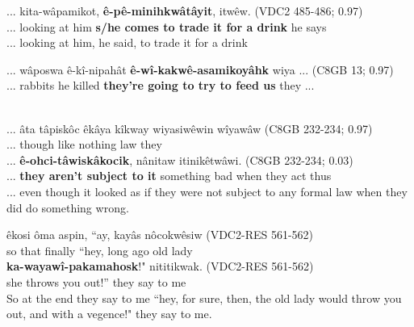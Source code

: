     \begin{exe}
    \ex 
    \gll ... kita-wâpamikot, \textbf{ê-pê-minihkwâtâyit}, itwêw. \tiny{(VDC2 485-486; 0.97)} \\
         ... {looking at him} {\textbf{s/he comes to trade it for a drink}} {he says}   \\
    \trans ... looking at him, he said, to trade it for a drink \tiny{\citep[68-69]{VandallDouquette1987}} \\
    \label{vta-ivc7}
    \end{exe}
    

    \begin{exe}
    \ex 
    \gll ... wâposwa ê-kî-nipahât \textbf{ê-wî-kakwê-asamikoyâhk} wiya ... \tiny{(C8GB 13; 0.97)} \\
         ... rabbits {he killed} {\textbf{they're going to try to feed us}} they ...  \\
    \trans   \\
    \label{vta-ivc8}
    \end{exe}
    

    \begin{exe}
    \ex 
    \gll ... âta tâpiskôc {êkâya kîkway} wiyasiwêwin wîyawâw \tiny{(C8GB 232-234; 0.97)}\\
         ... though like {nothing} law they \\
    \gll ... \textbf{ê-ohci-tâwiskâkocik}, nânitaw itinikêtwâwi. \tiny{(C8GB 232-234; 0.03)} \\
         ... {\textbf{they aren't subject to it}} {something bad} {when they act thus}  \\
    \trans ... even though it looked as if they were not subject to any formal law when they did do something wrong. \tiny{\citep[50-51]{VandallDouquette1987}} \\
    \label{vta-ivc9}
    \end{exe}
    

    \begin{exe}
    \ex 
    \gll êkosi ôma aspin, ``ay, kayâs nôcokwêsiw \tiny{(VDC2-RES 561-562)}\\
    so that finally ``hey, {long ago} {old lady}\\
    \gll \textbf{ka-wayawî-pakamahosk}!" nititikwak. \tiny{(VDC2-RES 561-562)} \\
    {she throws you out}!'' {they say to me}\\
    \trans So at the end they say to me ``hey, for sure, then, the old lady would throw you out, and with a vegence!" they say to me.
    \tiny{\citep[74-75]{VandallDouquette1987}} \\
    \label{vta-ivc10}
    \end{exe}
    
